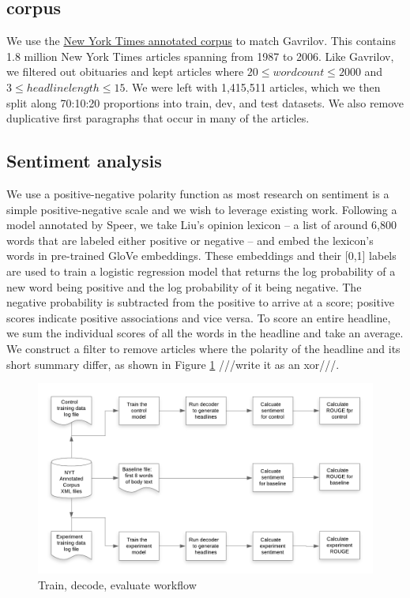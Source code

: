\documentclass[11pt]{article}
\begin{document}
\subsection{corpus}
We use the \href{https://catalog.ldc.upenn.edu/LDC2008T19}{New York Times annotated corpus} to match Gavrilov. This contains 1.8 million New York Times articles spanning from 1987 to 2006. Like Gavrilov, we filtered out obituaries and kept articles where $20 \le wordcount \le 2000$ and $3 \le headline length \le 15$. We were left with 1,415,511 articles, which we then split along 70:10:20 proportions into train, dev, and test datasets. We also remove duplicative first paragraphs that occur in many of the articles. 

\subsection{Sentiment analysis}
We use a positive-negative polarity function as most research on sentiment is a simple positive-negative scale and we wish to leverage existing work. Following a model annotated by Speer\cite{RacistAI}, we take Liu's opinion lexicon\cite{Hu:2004:MSC:1014052.1014073} -- a list of around 6,800 words that are labeled either positive or negative -- and embed the lexicon's words in pre-trained GloVe embeddings. These embeddings and their [0,1] labels are used to train a logistic regression model that returns the log probability of a new word being positive and the log probability of it being negative. The negative probability is subtracted from the positive to arrive at a score; positive scores indicate positive associations and vice versa. To score an entire headline, we sum the individual scores of all the words in the headline and take an average. We construct a filter to remove articles where the polarity of the headline and its short summary differ, as shown in Figure \ref{figure:workflow} ///write it as an xor///.

\begin{figure}
  \centering
  \includegraphics[width=17cm]{HeadGen_post_p.png}
  \caption{Train, decode, evaluate workflow}
  \label{figure:workflow}
\end{figure}
\end{document}
